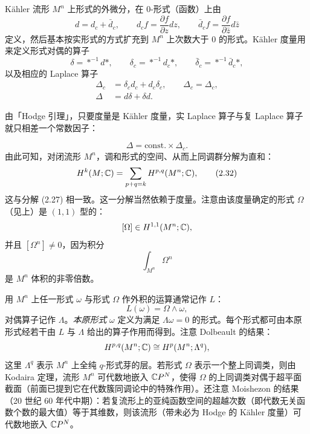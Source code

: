 Kähler 流形 $M^n$ 上形式的外微分，在 0-形式（函数）上由
\begin{equation}
  d=d_c+\bar d_c,\qquad d_cf=\frac{\partial f}{\partial z}dz,\qquad
  \bar d_cf=\frac{\partial f}{\partial\bar z}d\bar z \tag{2.29}
\end{equation}
定义，然后基本按实形式的方式扩充到 $M^n$ 上次数大于 0 的形式。Kähler 度量用来定义形式对偶的算子
\begin{equation}
  \delta=*^{-1}d*,\qquad \delta_c=*^{-1}d_c*,\qquad
  \bar\delta_c=*^{-1}\bar d_c*, \tag{2.30}
\end{equation}
以及相应的 Laplace 算子
\begin{equation}
  \begin{aligned}
    \Delta_c&=\delta_cd_c+d_c\delta_c,\qquad \Delta_c=\Delta_c,\\
    \Delta&=d\delta+\delta d.
  \end{aligned} \tag{2.31}
\end{equation}

由「Hodge 引理」，只要度量是 Kähler 度量，实 Laplace 算子与复 Laplace 算子就只相差一个常数因子：

\[
  \Delta=\mathrm{const.}\times\Delta_c.
\]
由此可知，对闭流形 $M^n$，调和形式的空间、从而上同调群分解为直和：
\begin{equation}
  H^k(M;\mathbb{C})=\sum_{p+q=k}H^{p,q}(M^n;\mathbb{C}), \tag{2.32}
\end{equation}
这与分解 (2.27) 相一致。这一分解当然依赖于度量。注意由该度量确定的形式 $\Omega$（见上）是 $(1,1)$ 型的：
\[
  [\Omega]\in H^{1,1}(M^n;\mathbb{C}),
\]
并且 $[\Omega^n]\ne0$，因为积分
\[
  \int_{M^n}\Omega^n
\]
是 $M^n$ 体积的非零倍数。

用 $M^n$ 上任一形式 $\omega$ 与形式 $\Omega$ 作外积的运算通常记作 $L$：
\[
  L(\omega)=\Omega\wedge\omega,
\]
对偶算子记作 $\Lambda$。\emph{本原形式} $\omega$ 定义为满足 $\Lambda\omega=0$ 的形式。每个形式都可由本原形式经若干由 $L$ 与 $\Lambda$ 给出的算子作用而得到。注意 Dolbeault 的结果：
\[
  H^{p,q}(M^n;\mathbb{C})\cong H^p(M^n;\Lambda^q),
\]
这里 $\Lambda^q$ 表示 $M^n$ 上全纯 $q$-形式芽的层。若形式 $\Omega$ 表示一个整上同调类，则由 Kodaira 定理，流形 $M^n$ 可代数地嵌入 $\mathbb{C}P^N$，使得 $\Omega$ 的上同调类对偶于超平面截面（前面已提到它在代数簇同调论中的特殊作用）。还注意 Moishezon 的结果（20 世纪 60 年代中期）：若复流形上的亚纯函数空间的超越次数（即代数无关函数个数的最大值）等于其维数，则该流形（带未必为 Hodge 的 Kähler 度量）可代数地嵌入 $\mathbb{C}P^N$。

